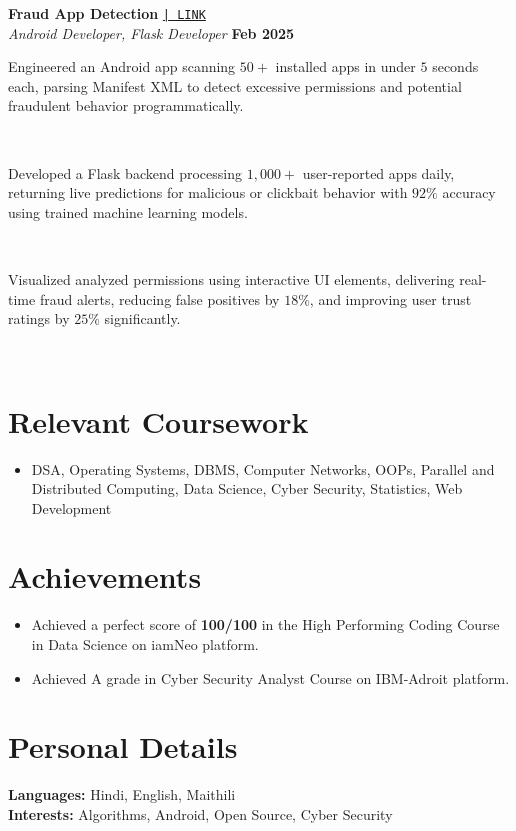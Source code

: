 \documentclass[a4paper,10pt]{article}
\begin{document}
\noindent
\textbf{Fraud App Detection}
\href{https://github.com/ppriyanshu26/FraudApp}{\texttt{| LINK}} \\
\textit{Android Developer, Flask Developer} \hfill \textbf{Feb 2025} \\[-8pt]

\noindent\makebox[1.5em][l]{--}%
\parbox[t]{\dimexpr\linewidth-1.5em\relax}{%
Engineered an Android app scanning $50+$ installed apps in under $5$ seconds each, parsing Manifest XML to detect excessive permissions and potential fraudulent behavior programmatically.} \\[0pt]

\noindent\makebox[1.5em][l]{--}%
\parbox[t]{\dimexpr\linewidth-1.5em\relax}{%
Developed a Flask backend processing $1{,}000+$ user-reported apps daily, returning live predictions for malicious or clickbait behavior with $92\%$ accuracy using trained machine learning models.} \\[0pt]

\noindent\makebox[1.5em][l]{--}%
\parbox[t]{\dimexpr\linewidth-1.5em\relax}{%
Visualized analyzed permissions using interactive UI elements, delivering real-time fraud alerts, reducing false positives by $18\%$, and improving user trust ratings by $25\%$ significantly.} \\[-4pt]





\section{Relevant Coursework}
  \begin{itemize}
    \item DSA, Operating Systems, DBMS, Computer Networks, OOPs, Parallel and Distributed Computing, Data Science, Cyber Security, Statistics, Web Development
  \end{itemize}

\section{Achievements}
  \begin{itemize}
    \item Achieved a perfect score of \textbf{100/100} in the High Performing Coding Course in Data Science on iamNeo platform.
    \item Achieved A grade in Cyber Security Analyst Course on IBM-Adroit platform.
  \end{itemize}


\section{Personal Details}
\vspace{-4pt}
\hspace{1.5em}
\begin{flushleft}
  \textbf{Languages:} Hindi, English, Maithili \\[6pt]
  \textbf{Interests:} Algorithms, Android, Open Source, Cyber Security
\end{flushleft}
\end{document}
